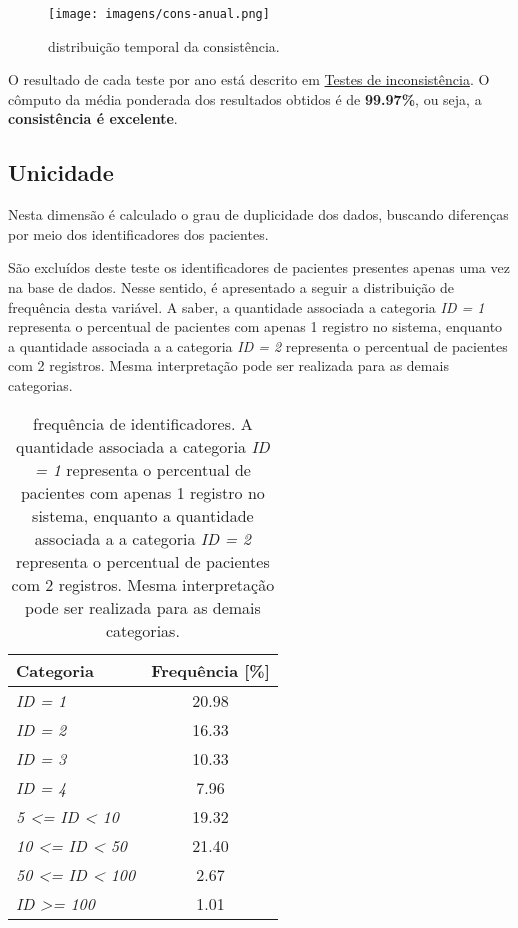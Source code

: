 \documentclass[
  12,
  table]{proadi}
\begin{document}
\begin{figure}
\centering
\texttt{[image: imagens/cons-anual.png]}
\caption{distribuição temporal da consistência.}
\end{figure}

O resultado de cada teste por ano está descrito em
\protect\hyperlink{testes-de-inconsistuxeancia}{Testes de
inconsistência}. O cômputo da média ponderada dos resultados obtidos é
de \textbf{99.97\%}, ou seja, a \textbf{consistência é excelente}.

\hypertarget{unicidade}{%
\subsection{Unicidade}\label{unicidade}}

\label{sub:unicidade}

Nesta dimensão é calculado o grau de duplicidade dos dados, buscando
diferenças por meio dos identificadores dos pacientes.

São excluídos deste teste os identificadores de pacientes presentes
apenas uma vez na base de dados. Nesse sentido, é apresentado a seguir a
distribuição de frequência desta variável. A saber, a quantidade
associada a categoria \emph{ID = 1} representa o percentual de pacientes
com apenas 1 registro no sistema, enquanto a quantidade associada a a
categoria \emph{ID = 2} representa o percentual de pacientes com 2
registros. Mesma interpretação pode ser realizada para as demais
categorias.

\begin{table}[H]

\caption{\label{tab:unnamed-chunk-18}frequência de identificadores. A quantidade associada a categoria \textit{ID = 1} representa o percentual de pacientes com apenas 1 registro no sistema, enquanto a quantidade associada a a categoria \textit{ID = 2} representa o percentual de pacientes com 2 registros. Mesma interpretação pode ser realizada para as demais categorias.}
\centering
\fontsize{10}{12}\selectfont
\begin{tabular}[t]{>{}lc}
\toprule
Categoria & Frequência [\%]\\
\midrule
\em{ID = 1} & 20.98\\
\em{ID = 2} & 16.33\\
\em{ID = 3} & 10.33\\
\em{ID = 4} & 7.96\\
\em{5 <= ID < 10} & 19.32\\
\addlinespace
\em{10 <= ID < 50} & 21.40\\
\em{50 <= ID < 100} & 2.67\\
\em{ID >= 100} & 1.01\\
\bottomrule
\end{tabular}
\end{table}
\end{document}
